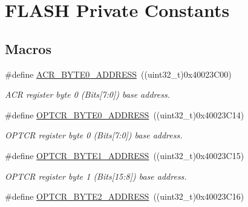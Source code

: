 \hypertarget{group___f_l_a_s_h___private___constants}{}\section{F\+L\+A\+SH Private Constants}
\label{group___f_l_a_s_h___private___constants}
\subsection*{Macros}
\begin{DoxyCompactItemize}
\item 
\#define \hyperlink{group___f_l_a_s_h___private___constants_gaeaca61fbcff69df08100280868bff214}{A\+C\+R\+\_\+\+B\+Y\+T\+E0\+\_\+\+A\+D\+D\+R\+E\+SS}~((uint32\+\_\+t)0x40023\+C00)\hypertarget{group___f_l_a_s_h___private___constants_gaeaca61fbcff69df08100280868bff214}{}\label{group___f_l_a_s_h___private___constants_gaeaca61fbcff69df08100280868bff214}

\begin{DoxyCompactList}\small\item\em A\+CR register byte 0 (Bits\mbox{[}7\+:0\mbox{]}) base address. \end{DoxyCompactList}\item 
\#define \hyperlink{group___f_l_a_s_h___private___constants_ga8223df020203a97af44e4b14e219d01e}{O\+P\+T\+C\+R\+\_\+\+B\+Y\+T\+E0\+\_\+\+A\+D\+D\+R\+E\+SS}~((uint32\+\_\+t)0x40023\+C14)\hypertarget{group___f_l_a_s_h___private___constants_ga8223df020203a97af44e4b14e219d01e}{}\label{group___f_l_a_s_h___private___constants_ga8223df020203a97af44e4b14e219d01e}

\begin{DoxyCompactList}\small\item\em O\+P\+T\+CR register byte 0 (Bits\mbox{[}7\+:0\mbox{]}) base address. \end{DoxyCompactList}\item 
\#define \hyperlink{group___f_l_a_s_h___private___constants_ga3c08568a9b3a9d213a70eff8e87117ac}{O\+P\+T\+C\+R\+\_\+\+B\+Y\+T\+E1\+\_\+\+A\+D\+D\+R\+E\+SS}~((uint32\+\_\+t)0x40023\+C15)\hypertarget{group___f_l_a_s_h___private___constants_ga3c08568a9b3a9d213a70eff8e87117ac}{}\label{group___f_l_a_s_h___private___constants_ga3c08568a9b3a9d213a70eff8e87117ac}

\begin{DoxyCompactList}\small\item\em O\+P\+T\+CR register byte 1 (Bits\mbox{[}15\+:8\mbox{]}) base address. \end{DoxyCompactList}\item 
\#define \hyperlink{group___f_l_a_s_h___private___constants_ga600e8029b876676da246a62924a294c7}{O\+P\+T\+C\+R\+\_\+\+B\+Y\+T\+E2\+\_\+\+A\+D\+D\+R\+E\+SS}~((uint32\+\_\+t)0x40023\+C16)\hypertarget{group___f_l_a_s_h___private___constants_ga600e8029b876676da246a62924a294c7}{}\label{group___f_l_a_s_h___private___constants_ga600e8029b876676da246a62924a294c7}


\end{DoxyCompactItemize}
